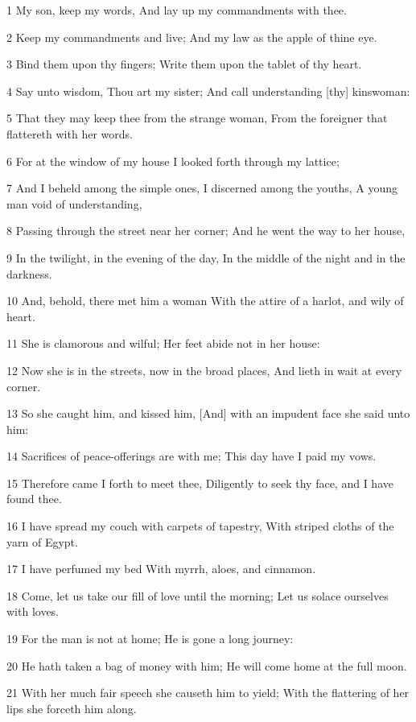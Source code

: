 \par 1 My son, keep my words, And lay up my commandments with thee.
\par 2 Keep my commandments and live; And my law as the apple of thine eye.
\par 3 Bind them upon thy fingers; Write them upon the tablet of thy heart.
\par 4 Say unto wisdom, Thou art my sister; And call understanding [thy] kinswoman:
\par 5 That they may keep thee from the strange woman, From the foreigner that flattereth with her words.
\par 6 For at the window of my house I looked forth through my lattice;
\par 7 And I beheld among the simple ones, I discerned among the youths, A young man void of understanding,
\par 8 Passing through the street near her corner; And he went the way to her house,
\par 9 In the twilight, in the evening of the day, In the middle of the night and in the darkness.
\par 10 And, behold, there met him a woman With the attire of a harlot, and wily of heart.
\par 11 She is clamorous and wilful; Her feet abide not in her house:
\par 12 Now she is in the streets, now in the broad places, And lieth in wait at every corner.
\par 13 So she caught him, and kissed him, [And] with an impudent face she said unto him:
\par 14 Sacrifices of peace-offerings are with me; This day have I paid my vows.
\par 15 Therefore came I forth to meet thee, Diligently to seek thy face, and I have found thee.
\par 16 I have spread my couch with carpets of tapestry, With striped cloths of the yarn of Egypt.
\par 17 I have perfumed my bed With myrrh, aloes, and cinnamon.
\par 18 Come, let us take our fill of love until the morning; Let us solace ourselves with loves.
\par 19 For the man is not at home; He is gone a long journey:
\par 20 He hath taken a bag of money with him; He will come home at the full moon.
\par 21 With her much fair speech she causeth him to yield; With the flattering of her lips she forceth him along.
